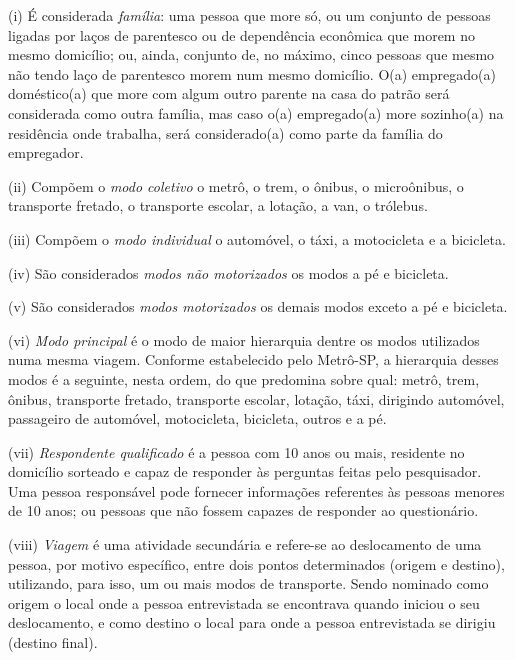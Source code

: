 \begin{compactitem}[]
\item (i) É considerada \emph{família}: uma pessoa que more só, ou um conjunto de pessoas ligadas por laços de parentesco ou de dependência econômica que morem no mesmo domicílio; ou, ainda, conjunto de, no máximo, cinco pessoas que mesmo não tendo laço de parentesco morem num mesmo domicílio. O(a) empregado(a) doméstico(a) que more com algum outro parente na casa do patrão será considerada como outra família, mas caso o(a) empregado(a) more sozinho(a) na residência onde trabalha, será considerado(a) como parte da família do empregador.

\item (ii) Compõem o \emph{modo coletivo} o metrô, o trem, o ônibus, o microônibus, o transporte fretado, o transporte escolar, a lotação, a van, o trólebus.

\item (iii) Compõem o \emph{modo individual} o automóvel, o táxi, a motocicleta e a bicicleta.

\item (iv) São considerados \emph{modos não motorizados} os modos a pé e bicicleta.

\item (v) São considerados \emph{modos motorizados} os demais modos exceto a pé e bicicleta.

\item (vi) \emph{Modo principal} é o modo de maior hierarquia dentre os modos utilizados numa mesma viagem. Conforme estabelecido pelo Metrô-SP, a hierarquia desses modos é a seguinte, nesta ordem, do que predomina sobre qual: metrô, trem, ônibus, transporte fretado, transporte escolar, lotação, táxi, dirigindo automóvel, passageiro de automóvel, motocicleta, bicicleta, outros e a pé.

\item (vii) \emph{Respondente qualificado} é a pessoa com 10 anos ou mais, residente no domicílio sorteado e capaz de responder às perguntas feitas pelo pesquisador. Uma pessoa responsável pode fornecer informações referentes às pessoas menores de 10 anos; ou pessoas que não fossem capazes de responder ao questionário.

\item (viii) \emph{Viagem} é uma atividade secundária e refere-se ao deslocamento de uma pessoa, por motivo específico, entre dois pontos determinados (origem e destino), utilizando, para isso, um ou mais modos de transporte. Sendo nominado como origem o local onde a pessoa entrevistada se encontrava quando iniciou o seu deslocamento, e como destino o local para onde a pessoa entrevistada se dirigiu (destino final).


\end{compactitem}
